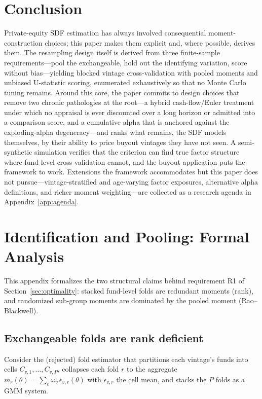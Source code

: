 \documentclass[11pt]{article}
\begin{document}
\section{Conclusion}
\label{sec:conclusion}

Private-equity SDF estimation has always involved consequential moment-construction choices; this paper makes them explicit and, where possible, derives them. The resampling design itself is derived from three finite-sample requirements---pool the exchangeable, hold out the identifying variation, score without bias---yielding blocked vintage cross-validation with pooled moments and unbiased U-statistic scoring, enumerated exhaustively so that no Monte Carlo tuning remains. Around this core, the paper commits to design choices that remove two chronic pathologies at the root---a hybrid cash-flow/Euler treatment under which no appraisal is ever discounted over a long horizon or admitted into a comparison score, and a cumulative alpha that is anchored against the exploding-alpha degeneracy---and ranks what remains, the SDF models themselves, by their ability to price buyout vintages they have not seen. A semi-synthetic simulation verifies that the criterion can find true factor structure where fund-level cross-validation cannot, and the buyout application puts the framework to work. Extensions the framework accommodates but this paper does not pursue---vintage-stratified and age-varying factor exposures, alternative alpha definitions, and richer moment weighting---are collected as a research agenda in Appendix~\ref{app:agenda}.

\appendix

\section{Identification and Pooling: Formal Analysis}
\label{app:identification}

This appendix formalizes the two structural claims behind requirement R1 of Section~\ref{sec:optimality}: stacked fund-level folds are redundant moments (rank), and randomized sub-group moments are dominated by the pooled moment (Rao--Blackwell).

\subsection{Exchangeable folds are rank deficient}

Consider the (rejected) fold estimator that partitions each vintage's funds into cells \(C_{v,1},\dots,C_{v,P}\), collapses each fold \(r\) to the aggregate \(m_{r}(\theta)=\sum_{v}\omega_{v}\,\epsilon_{v,r}(\theta)\) with \(\epsilon_{v,r}\) the cell mean, and stacks the \(P\) folds as a GMM system.
\end{document}
